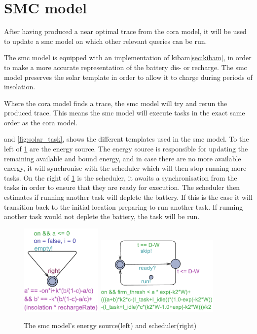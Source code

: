 \section{SMC model} \label{sec:smc}
After having produced a near optimal trace from the \gls{cora} model, it will be used to update a \gls{smc} model on which other relevant queries can be run.

The \gls{smc} model is equipped with an implementation of \gls{kibam}\cref{sec:kibam}, in order to make a more accurate representation of the battery dis- or recharge. The \gls{smc} model preserves the solar template in order to allow it to charge during periods of insolation.

Where the \gls{cora} model finds a trace, the \gls{smc} model will try and rerun the produced trace. This means the \gls{smc} model will execute tasks in the exact same order as the \gls{cora} model.%

 and \cref{fig:solar_task}, shows the different templates used in the \gls{smc} model. To the left of \cref{fig:cost_schedule} are the energy source. The energy source is responsible for updating the remaining available and bound energy, and in case there are no more available energy, it will synchronise with the scheduler which will then stop running more tasks.
On the right of \cref{fig:cost_schedule} is the scheduler, it awaits a synchronisation from the tasks in order to ensure that they are ready for execution. The scheduler then estimates if running another task will deplete the battery. If this is the case it will transition back to the initial location preparing to run another task. If running another task would not deplete the battery, the task will be run.

\begin{figure}[H]%
	\centering
	\subfloat
	{{\includegraphics[width=4cm]{graphics/smc_costhandler.pdf} }}%
	\qquad
	\subfloat
	{{\includegraphics[width=6cm]{graphics/smc_scheduler.pdf} }}%
	\caption{The \gls{smc} model's energy source(left) and scheduler(right)}%
	\label{fig:cost_schedule}%
\end{figure}

